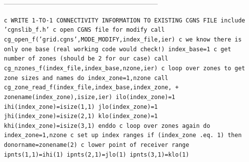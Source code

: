 \documentclass[12pt]{article}
\begin{document}
--------------------------------------------------------------------

{\tt \noindent c  WRITE 1-TO-1 CONNECTIVITY INFORMATION TO EXISTING CGNS FILE
\newline\indent      include 'cgnslib\_f.h'
\newline c  open CGNS file for modify
\newline\indent      call cg\_open\_f('grid.cgns',MODE\_MODIFY,index\_file,ier)
\newline c  we know there is only one base (real working code would check!)
\newline\indent      index\_base=1
\newline c   get number of zones (should be 2 for our case)
\newline\indent      call cg\_nzones\_f(index\_file,index\_base,nzone,ier)
\newline c   loop over zones to get zone sizes and names
\newline\indent      do index\_zone=1,nzone
\newline\indent\indent      call cg\_zone\_read\_f(index\_file,index\_base,index\_zone,
\newline \indent + \indent zonename(index\_zone),isize,ier)
\newline\indent\indent      ilo(index\_zone)=1
\newline\indent\indent      ihi(index\_zone)=isize(1,1)
\newline\indent\indent      jlo(index\_zone)=1
\newline\indent\indent      jhi(index\_zone)=isize(2,1)
\newline\indent\indent      klo(index\_zone)=1
\newline\indent\indent      khi(index\_zone)=isize(3,1)
\newline\indent      enddo
\newline c   loop over zones again
\newline\indent      do index\_zone=1,nzone
\newline c   set up index ranges
\newline\indent\indent   if (index\_zone .eq. 1) then
\newline\indent\indent\indent      donorname=zonename(2)
\newline c   lower point of receiver range
\newline\indent\indent\indent      ipnts(1,1)=ihi(1)
\newline\indent\indent\indent      ipnts(2,1)=jlo(1)
\newline\indent\indent\indent      ipnts(3,1)=klo(1)
}
\end{document}
